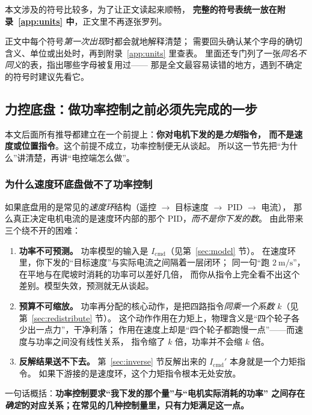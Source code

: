 \documentclass[cn,blue,11pt,device=normal]{elegantnote}
\begin{document}
本文涉及的符号比较多，为了让正文读起来顺畅，
\textbf{完整的符号表统一放在附录~\ref{app:units} 中}，正文里不再逐张罗列。

正文中每个符号\emph{第一次出现}时都会就地解释清楚；
需要回头确认某个字母的确切含义、单位或出处时，再到附录~\ref{app:units} 里查表。
里面还专门列了一张\emph{同名不同义}的表，指出哪些字母被复用过——
那是全文最容易读错的地方，遇到不确定的符号时建议先看它。



\subsection{力控底盘：做功率控制之前必须先完成的一步}

本文后面所有推导都建立在一个前提上：\textbf{你对电机下发的是\emph{力矩}指令，
而不是速度或位置指令}。这个前提不成立，功率控制便无从谈起。
所以这一节先把“为什么”讲清楚，再讲“电控端怎么做”。

\subsubsection{为什么速度环底盘做不了功率控制}

如果底盘用的是常见的\emph{速度环}结构（遥控 $\to$ 目标速度 $\to$ PID $\to$ 电流），
那么真正决定电机电流的是速度环内部的那个 PID，\emph{而不是你下发的数}。
由此带来三个绕不开的困难：

\begin{enumerate}
  \item \textbf{功率不可预测。}
  功率模型的输入是 $I_{\mathrm{cmd}}$（见第~\ref{sec:model} 节）。
  在速度环里，你下发的“目标速度”与实际电流之间隔着一层闭环；
  同一句“跑 $2\ \mathrm{m/s}$”，在平地与在爬坡时消耗的功率可以差好几倍，
  而你从指令上完全看不出这个差别。模型失效，预测就无从谈起。
  \item \textbf{预算不可缩放。}
  功率再分配的核心动作，是把四路指令\emph{同乘一个系数} $k$（见第~\ref{sec:redistribute} 节）。
  这个动作作用在力矩上，物理含义是“四个轮子各少出一点力”，干净利落；
  作用在速度上却是“四个轮子都跑慢一点”——而速度与功率之间没有线性关系，
  指令缩了 $k$ 倍，功率并不会缩 $k$ 倍。
  \item \textbf{反解结果送不下去。}
  第~\ref{sec:inverse} 节反解出来的 $I_{\mathrm{cmd}}'$ 本身就是一个力矩指令。
  如果下游接的是速度环，这个力矩指令根本无处安放。
\end{enumerate}

一句话概括：\textbf{功率控制要求“我下发的那个量”与“电机实际消耗的功率”
之间存在\emph{确定}的对应关系；在常见的几种控制量里，只有力矩满足这一点。}
\end{document}
